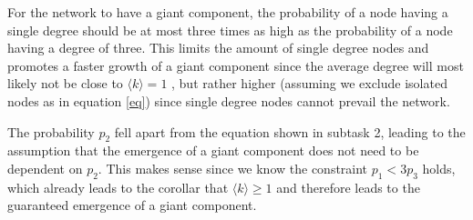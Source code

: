 \begin{enumerate}
	For the network to have a giant component, the probability of a node having a single degree should be at most three times as high as the probability of a node having a degree of three. This limits the amount of single degree nodes and promotes a faster growth of a giant component since the average degree will most likely not be close to $\langle k \rangle = 1$ , but rather higher (assuming we exclude isolated nodes as in equation \ref{eq}) since single degree nodes cannot prevail the network. 
	
	The probability $p_2$ fell apart from the equation shown in subtask 2, leading to the assumption that the emergence of a giant component does not need to be dependent on $p_2$. This makes sense since we know the constraint $p_1 < 3p_3$ holds, which already leads to the corollar that $\langle k \rangle \ge 1$ and therefore leads to the guaranteed emergence of a giant component.
\end{enumerate}